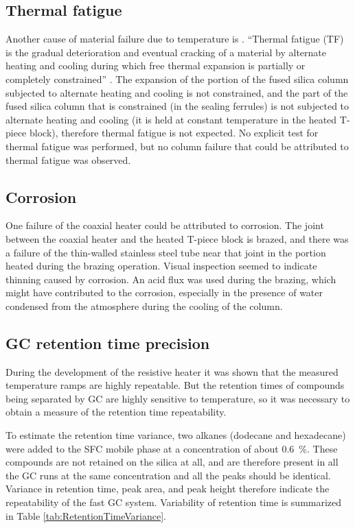 \subsection{Thermal fatigue}

Another cause of material failure due to temperature is . ``Thermal fatigue (TF) is the gradual deterioration and eventual
cracking of a material by alternate heating and cooling during which free
thermal expansion is partially or completely constrained'' \autocite{Rao2001}.
The expansion of the portion of the fused silica column subjected to alternate
heating and cooling is not constrained, and the part of the fused silica column
that is constrained (in the sealing ferrules) is not subjected to alternate
heating and cooling (it is held at constant temperature in the heated T-piece
block), therefore thermal fatigue is not expected. No explicit test for thermal
fatigue was performed, but no column failure that could be attributed to thermal
fatigue was observed.

\subsection{Corrosion}
One failure of the coaxial heater could be attributed to corrosion. The joint
between the coaxial heater and the heated T-piece block is brazed, and there was
a failure of the thin-walled stainless steel tube near that joint in the portion
heated during the brazing operation. Visual inspection seemed to indicate
thinning caused by corrosion. An acid flux was used during the brazing, which
might have contributed to the corrosion, especially in the presence of water
condensed from the atmosphere during the cooling of the column.

\subsection{GC retention time precision}

During the development of the resistive heater it was shown that the measured
temperature ramps are highly repeatable. But the retention times of  compounds
being separated by GC are highly sensitive to temperature, so it was necessary
to obtain a measure of the retention time repeatability.

To estimate the retention time variance, two alkanes (dodecane and hexadecane)
were added to the SFC mobile phase at a concentration of about
\SI{0.6}{\percent}. These compounds are not retained on the silica at all, and
are therefore present in all the GC runs at the same concentration and all the
peaks should be identical. Variance in retention time, peak area, and peak
height therefore indicate the repeatability of the fast GC system. Variability
of retention time is summarized in Table \ref{tab:RetentionTimeVariance}.

